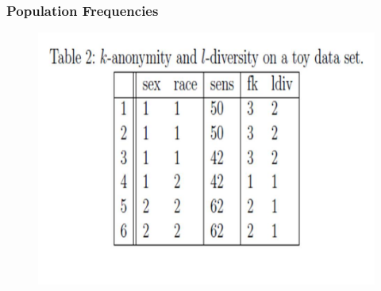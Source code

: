 \documentclass{beamer}
\begin{document}
	\begin{frame}	
		\frametitle{Population Frequencies}
		
\begin{figure}
\centering
\includegraphics[width=0.99\linewidth]{TemplJPGs2/Table2}
\caption{}
\label{fig:Table2}
\end{figure}


\end{frame}
\end{document}
